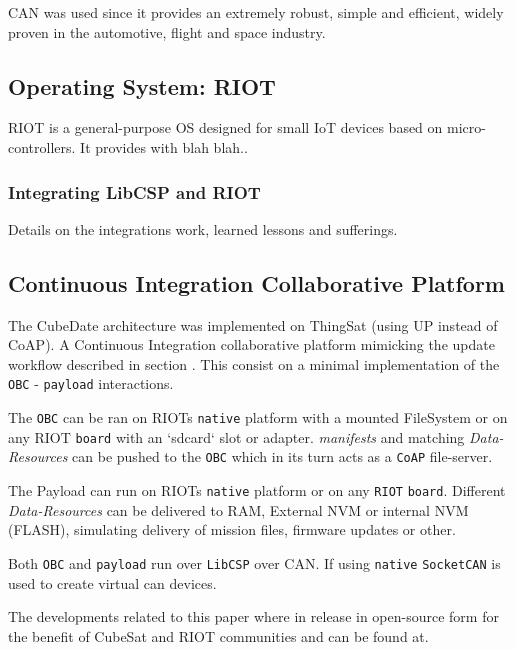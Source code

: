CAN was used since it provides an extremely robust, simple and efficient,
widely proven in the automotive, flight and space industry.

\subsection{Operating System: RIOT}

RIOT is a general-purpose OS designed for small IoT devices based on micro-controllers.
It provides with blah blah..

\subsubsection{Integrating LibCSP and RIOT}

Details on the integrations work, learned lessons and sufferings.

\subsection{Continuous Integration \- Collaborative Platform}

The CubeDate architecture was implemented on ThingSat (using UP instead of CoAP).
A Continuous Integration collaborative platform mimicking the update workflow described
in section . This consist on a minimal implementation of the
\texttt{OBC} - \texttt{payload} interactions.

The \texttt{OBC} can be ran on RIOTs \texttt{native} platform with a mounted
FileSystem or on any RIOT \texttt{board} with an `sdcard` slot or adapter.
\textit{manifests} and matching \textit{Data-Resources} can be pushed to the
\texttt{OBC} which in its turn acts as a \texttt{CoAP} file-server.

The Payload can run on RIOTs \texttt{native} platform or on any \texttt{RIOT}
\texttt{board}. Different \textit{Data-Resources} can be delivered to RAM,
External NVM or internal NVM (FLASH), simulating delivery of mission files,
firmware updates or other.

Both \texttt{OBC} and \texttt{payload} run over \texttt{LibCSP} over CAN. If
using \texttt{native} \texttt{SocketCAN} is used to create virtual can
devices.


The developments related to this paper where in release in open-source form for
the benefit of CubeSat and RIOT communities and can be found at.

